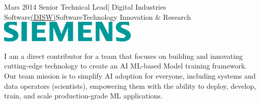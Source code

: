 \begin{experiences}



\experience
    {Mars 2014}          {Senior Technical Lead| Digital Industries Software\href{https://www.linkedin.com/company/siemenssoftware/products/}{(DISW)}}{Software}{Technology Innovation \& Research}
   { \includegraphics[width=0.8\linewidth]{sie.png}}   {  I am a direct contributor for a team that focuses on building and innovating cutting-edge technology to create an AI ML-based Model training framework. Our team mission is to simplify AI adoption for everyone, including systems and data operators (scientists), empowering them with the ability to deploy, develop, train, and scale production-grade ML applications.
    
}
\end{experiences}
